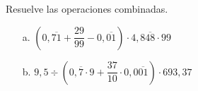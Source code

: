 \documentclass[spanish,letterpaper, 11pt, addpoints, answers]{exam}
\begin{document}
\begin{questions}
\begin{multicols}{4}
\begin{itemize}
        \end{itemize}
        
      \end{multicols}

    \question Resuelve las operaciones combinadas.
    \begin{multicols}{2}
      \begin{itemize}
        \item[a.] $\left(0,\overline{71}+\dfrac{29}{99}-0,\overline{01}\right)\cdot 4,8\overline{48}\cdot 99$
        \item[b.] $9,5\div \left(0,\overline{7}\cdot 9+\dfrac{37}{10}\cdot 0,0\overline{01}\right)\cdot 693,37$
      \end{itemize}
      
    \end{multicols}


\end{questions}
\end{document}
